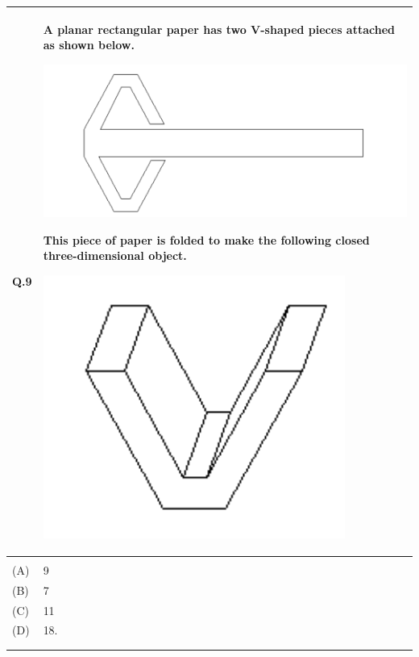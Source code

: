 \documentclass[12pt]{article}
\begin{document}
\begin{table}[H]
\renewcommand{\arraystretch}{2.8}
\setlength{\tabcolsep}{8pt}
\begin{tabular}{|l|p{15cm}|}
\hline
Q.9& A planar rectangular paper has two V-shaped pieces attached as shown below.

\hspace{1cm}\includegraphics[scale = 0.8]{LatexImage1.png} 

This piece of paper is folded to make the following closed three-dimensional object.

\hspace{4cm}\includegraphics[scale = 0.9]{LatexImage2.png} 


 \\ \hline
 & \\ \hline
(A)& 9\\ \hline
(B)&7\\ \hline
(C)&11 \\ \hline
(D)& 18.\\ \hline
 & \\  
  & \\  \hline

\end{tabular}
\end{table}
\end{document}
